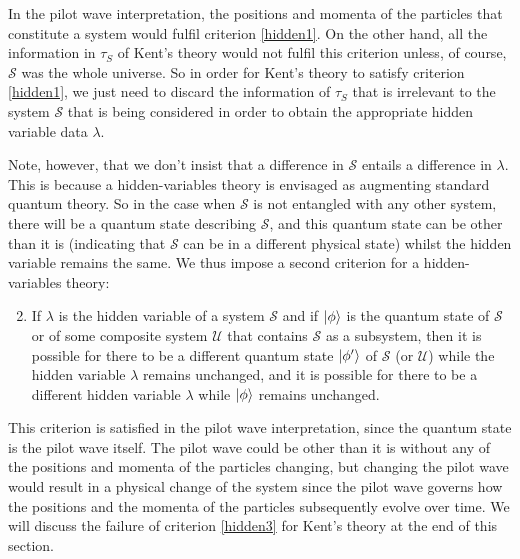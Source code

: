 In the pilot wave interpretation, the positions and momenta of the particles that constitute a system would fulfil criterion \ref{hidden1}. On the other hand, all the information in $\tau_S$ of Kent's theory would not fulfil this criterion unless, of course, $\mathcal{S}$ was the whole universe. So in order for Kent's theory to satisfy criterion \ref{hidden1}, we just need to discard the information of $\tau_S$ that is irrelevant to the system $\mathcal{S}$ that is being considered in order to obtain the appropriate hidden variable data $\lambda$. 

Note, however, that we don't insist that a difference in $\mathcal{S}$ entails a difference in $\lambda$. This is because a hidden-variables theory is envisaged as augmenting standard quantum theory. So in the case when $\mathcal{S}$ is not entangled with any other system, there will be a quantum state describing $\mathcal{S}$, and this quantum state can be other than it is (indicating that $\mathcal{S}$ can be in a different physical state)  whilst the hidden variable remains the same. We thus impose a second criterion for a hidden-variables theory:
\begin{enumerate}
	\setcounter{enumi}{1}
	\item \label{hidden3} If $\lambda$ is the hidden variable of a system $\mathcal{S}$ and if $\ket{\phi}$ is the quantum state of $\mathcal{S}$ or of some composite system $\mathcal{U}$ that contains $\mathcal{S}$ as a subsystem, then it is possible for there to be a different quantum state $\ket{\phi'}$ of $\mathcal{S}$ (or $\mathcal{U}$) while the hidden variable $\lambda$ remains unchanged, and it is possible for there to be a different hidden variable $\lambda$ while $\ket{\phi}$ remains unchanged.
\end{enumerate} 
This criterion is satisfied in the pilot wave interpretation, since the quantum state is the pilot wave itself. The pilot wave could be other than it is without any of the positions and momenta of the particles changing, but changing the pilot wave would result in a physical change of the system since the pilot wave governs how  the positions and the momenta of the particles subsequently evolve over time. We will discuss the failure of criterion \ref{hidden3} for Kent's theory at the end of this section.

